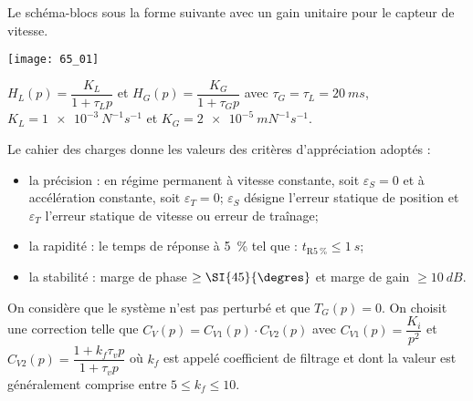 \normaltrue \difficilefalse \tdifficilefalse
\correctionfalse

\setcounter{question}{0}


\ifcorrection
\else
{}
\fi
\ifprof
\else 

Le schéma-blocs sous la forme suivante avec un gain unitaire pour le capteur
de vitesse.

\begin{marginfigure}
\texttt{[image: 65\_01]}
\end{marginfigure}

$H_L(p)=\dfrac{K_L}{1+\tau_L p}$ et $H_G(p)=\dfrac{K_G}{1+\tau_G p}$  avec $\tau_G=\tau_L = \SI{20}{ms}$, $K_L = \SI{1e-3}{N^{-1}s^{-1}}$ et $K_G = \SI{2e-5}{mN^{-1}s^{-1}}$.


Le cahier des charges donne les valeurs des critères d'appréciation adoptés :
\begin{itemize}
\item la précision : en régime permanent à vitesse constante, soit $\varepsilon_S=0$ et à accélération constante, soit $\varepsilon_T=0$; $\varepsilon_S$ désigne l'erreur statique de position et $\varepsilon_T$ l'erreur statique de vitesse ou erreur de traînage;
\item la rapidité : le temps de réponse à \SI{5}{\%} tel que : $t_{\text{R}\SI{5}{\%}}\leq \SI{1}{s}$;
\item la stabilité : marge de phase $\geq \SI{45}{\degres}$ et marge de gain $\geq \SI{10}{dB}$.
\end{itemize}

On considère que le système n'est pas perturbé et que $T_G(p)=0$.
On choisit une correction telle que $C_{V}(p)= C_{V1}(p) \cdot C_{V2}(p) $ avec $C_{V1}(p)=\dfrac{K_i}{p^2}$ et $C_{V2}(p)=\dfrac{1+k_f \tau_v p }{1+\tau_v p }$ où $k_f$ est appelé coefficient de filtrage et dont la valeur est généralement comprise entre $5\leq k_f \leq 10$.
\fi

\ifprof
\else 
\fi


